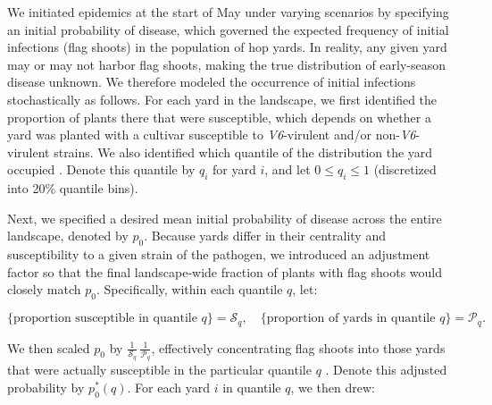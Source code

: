 \documentclass[10pt,a4paper]{article}
\begin{document}
We initiated epidemics at the start of May under varying scenarios by specifying an initial probability of disease, which governed the expected frequency of initial infections (flag shoots) in the population of hop yards. In reality, any given yard may or may not harbor flag shoots, making the true distribution of early-season disease unknown. We therefore modeled the occurrence of initial infections stochastically as follows. For each yard in the landscape, we first identified the proportion of plants there that were susceptible, which depends on whether a yard was planted with a cultivar susceptible to \textit{V6}-virulent and/or non-\textit{V6}-virulent strains. We also identified which quantile of the  distribution the yard occupied \parencite{Gent2019a}. Denote this quantile by $q_i$ for yard $i$, and let $0 \le q_i \le 1$ (discretized into 20\% quantile bins).

Next, we specified a desired mean initial probability of disease across the entire landscape, denoted by $p_0$. Because yards differ in their centrality and susceptibility to a given strain of the pathogen, we introduced an adjustment factor so that the final landscape-wide fraction of plants with flag shoots would closely match $p_0$. Specifically, within each  quantile $q$, let:

$$\text{\{proportion susceptible in quantile } q\} = \mathcal{S}_q, \quad \text{\{proportion of yards in quantile } q\} = \mathcal{P}_q.$$

We then scaled $p_0$ by $\frac{1}{\mathcal{S}_q}\,\frac{1}{\mathcal{P}_q}$, effectively concentrating flag shoots into those yards that were actually susceptible in the particular quantile $q$ . Denote this adjusted probability by $p_0^{\ast}(q)$. For each yard $i$ in quantile $q$, we then drew:
\end{document}
